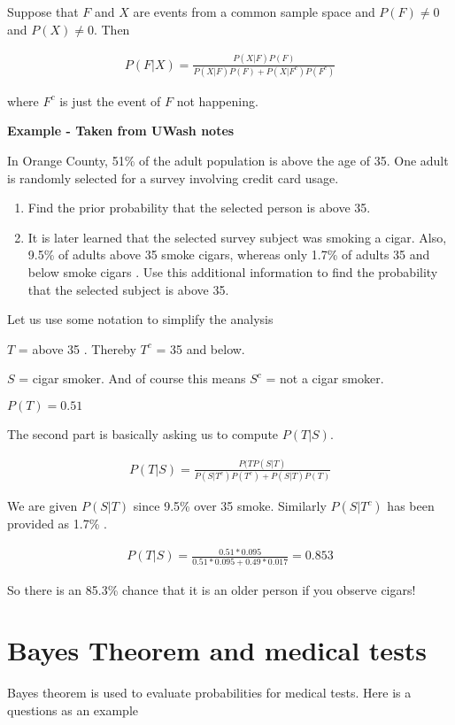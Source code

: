 \documentclass[12pt]{article}
\begin{document}
Suppose that $F$ and $X$ are events from a common sample space and $P(F) \neq 0$ and $P(X) \neq 0$. Then

\begin{align*}
P(F|X) = \frac{P(X|F)P(F)}{P(X|F)P(F) + P(X|F^c)P(F^c)}
\end{align*}

where $F^c$ is just the event of $F$ not happening.

\textbf{Example - Taken from UWash notes}

In Orange County, 51\% of the adult population is above the age of 35. One adult  is randomly selected
for a survey involving credit card usage.
\begin{enumerate}
\item Find the prior probability that the selected person is above 35.
\item It is later learned that the selected survey subject was smoking a cigar. Also, 9.5\%
of adults above 35 smoke cigars, whereas only 1.7\% of adults 35 and below smoke cigars . Use this
additional information to find the probability that the selected subject is above 35.
\end{enumerate}

Let us use some notation to simplify the analysis

$T$ = above 35 . Thereby $T^c$ = 35 and below. 

$S$ = cigar smoker. And of course this means $S^c$ = not a cigar smoker.

$P(T) = 0.51$

The second part is basically asking us to compute $P(T|S)$.

\begin{align*}
P(T|S) = \frac{P(T P(S|T)}{P(S|T^c) P(T^c) + P(S|T) P(T)}
\end{align*}

We are given $P(S|T)$ since 9.5\% over 35 smoke. Similarly $P(S|T^c)$ has been provided as 1.7\%  .

\begin{align*}
P(T|S) = \frac{0.51 * 0.095}{0.51 * 0.095 + 0.49 * 0.017}
= 0.853
\end{align*}

So there is an 85.3\% chance that it is an older person if you observe cigars! 

\section*{Bayes Theorem and medical tests}
Bayes theorem is used to evaluate probabilities for medical tests. Here is a questions as an example
\end{document}
